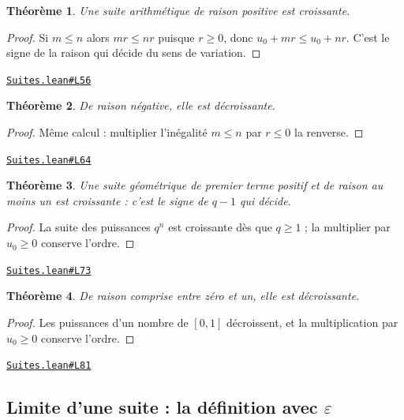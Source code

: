 \documentclass[11pt,a4paper]{article}
\theoremstyle{definition}
\theoremstyle{plain}
\newtheorem{theoreme}{Théorème}
\newcommand{\source}[2]{\par\smallskip\noindent\hfill{\footnotesize\href{#1}{\texttt{#2}}}\par\smallskip}
\begin{document}
\begin{theoreme}
Une suite arithmétique de raison positive est croissante.
\end{theoreme}

\begin{proof}
Si $m \le n$ alors $mr \le nr$ puisque $r \ge 0$, donc $u_0 + mr \le u_0 + nr$. C'est le
signe de la raison qui décide du sens de variation.
\end{proof}
\source{https://github.com/Commutator-IO/learn-lean/blob/main/cours/02-lycee/03-suites/Suites.lean\#L56}{Suites.lean\#L56}

\begin{theoreme}
De raison négative, elle est décroissante.
\end{theoreme}

\begin{proof}
Même calcul : multiplier l'inégalité $m \le n$ par $r \le 0$ la renverse.
\end{proof}
\source{https://github.com/Commutator-IO/learn-lean/blob/main/cours/02-lycee/03-suites/Suites.lean\#L64}{Suites.lean\#L64}

\begin{theoreme}
Une suite géométrique de premier terme positif et de raison au moins un est croissante :
c'est le signe de $q - 1$ qui décide.
\end{theoreme}

\begin{proof}
La suite des puissances $q^n$ est croissante dès que $q \ge 1$ ; la multiplier par
$u_0 \ge 0$ conserve l'ordre.
\end{proof}
\source{https://github.com/Commutator-IO/learn-lean/blob/main/cours/02-lycee/03-suites/Suites.lean\#L73}{Suites.lean\#L73}

\begin{theoreme}
De raison comprise entre zéro et un, elle est décroissante.
\end{theoreme}

\begin{proof}
Les puissances d'un nombre de $[0, 1]$ décroissent, et la multiplication par
$u_0 \ge 0$ conserve l'ordre.
\end{proof}
\source{https://github.com/Commutator-IO/learn-lean/blob/main/cours/02-lycee/03-suites/Suites.lean\#L81}{Suites.lean\#L81}

\subsection{Limite d'une suite : la définition avec \texttt{\(\varepsilon\)}}
\end{document}
